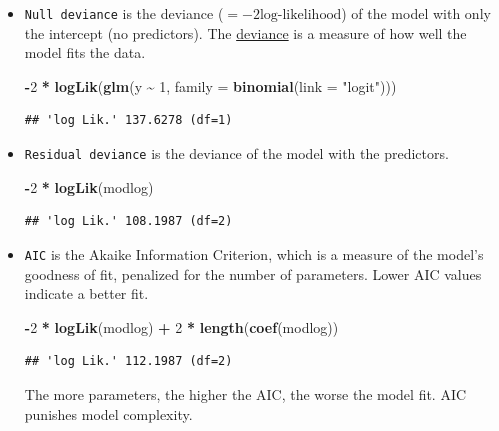 \documentclass[
]{book}
\newenvironment{Shaded}{\begin{snugshade}}{\end{snugshade}}
\newcommand{\AttributeTok}[1]{\textcolor[rgb]{0.13,0.29,0.53}{#1}}
\newcommand{\DecValTok}[1]{\textcolor[rgb]{0.00,0.00,0.81}{#1}}
\newcommand{\FunctionTok}[1]{\textcolor[rgb]{0.13,0.29,0.53}{\textbf{#1}}}
\newcommand{\NormalTok}[1]{#1}
\newcommand{\SpecialCharTok}[1]{\textcolor[rgb]{0.81,0.36,0.00}{\textbf{#1}}}
\newcommand{\StringTok}[1]{\textcolor[rgb]{0.31,0.60,0.02}{#1}}
\begin{document}
\begin{itemize}
  This difference is not constant (see graph below, red line), but depends on the value of \(AGE\),
  since the inverse logit function is non-linear.
\item
  \texttt{Null\ deviance} is the deviance (\(= -2 \text{log-likelihood}\)) of
  the model with only the intercept (no predictors).
  The \href{https://en.wikipedia.org/wiki/Deviance_(statistics)}{deviance}
  is a measure of how well the model fits the data.

\begin{Shaded}
\begin{Highlighting}[]
\SpecialCharTok{{-}}\DecValTok{2} \SpecialCharTok{*} \FunctionTok{logLik}\NormalTok{(}\FunctionTok{glm}\NormalTok{(y }\SpecialCharTok{\textasciitilde{}} \DecValTok{1}\NormalTok{, }\AttributeTok{family =} \FunctionTok{binomial}\NormalTok{(}\AttributeTok{link =} \StringTok{"logit"}\NormalTok{)))}
\end{Highlighting}
\end{Shaded}

\begin{verbatim}
## 'log Lik.' 137.6278 (df=1)
\end{verbatim}
\item
  \texttt{Residual\ deviance} is the deviance of the model with the predictors.

\begin{Shaded}
\begin{Highlighting}[]
 \SpecialCharTok{{-}}\DecValTok{2} \SpecialCharTok{*} \FunctionTok{logLik}\NormalTok{(modlog)}
\end{Highlighting}
\end{Shaded}

\begin{verbatim}
## 'log Lik.' 108.1987 (df=2)
\end{verbatim}
\item
  \texttt{AIC} is the Akaike Information Criterion,
  which is a measure of the model's goodness of fit,
  penalized for the number of parameters. Lower AIC values indicate a better fit.

\begin{Shaded}
\begin{Highlighting}[]
\SpecialCharTok{{-}}\DecValTok{2} \SpecialCharTok{*} \FunctionTok{logLik}\NormalTok{(modlog) }\SpecialCharTok{+} \DecValTok{2} \SpecialCharTok{*} \FunctionTok{length}\NormalTok{(}\FunctionTok{coef}\NormalTok{(modlog))}
\end{Highlighting}
\end{Shaded}

\begin{verbatim}
## 'log Lik.' 112.1987 (df=2)
\end{verbatim}

  The more parameters, the higher the AIC, the worse the model fit.
  AIC punishes model complexity.
\end{itemize}
\end{document}
